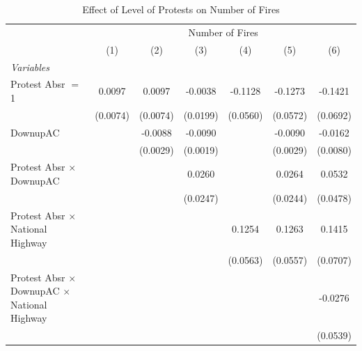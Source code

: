 
\begin{table}[htbp]
   \caption{\label{tab:protest_treat_main} Effect of Level of Protests on Number of Fires}
   \centering
   \begin{tabular}{lcccccc}
      \tabularnewline \midrule \midrule
       & \multicolumn{6}{c}{Number of Fires}\\
                                                                 & (1)           & (2)           & (3)           & (4)           & (5)           & (6)\\  
      \midrule
      \emph{Variables}\\
      Protest Absr $=$ 1                                         & 0.0097        & 0.0097        & -0.0038       & -0.1128       & -0.1273       & -0.1421\\   
                                                                 & (0.0074)      & (0.0074)      & (0.0199)      & (0.0560)      & (0.0572)      & (0.0692)\\   
      DownupAC                                                   &               & -0.0088       & -0.0090       &               & -0.0090       & -0.0162\\   
                                                                 &               & (0.0029)      & (0.0019)      &               & (0.0029)      & (0.0080)\\   
      Protest Absr $\times$ DownupAC                             &               &               & 0.0260        &               & 0.0264        & 0.0532\\   
                                                                 &               &               & (0.0247)      &               & (0.0244)      & (0.0478)\\   
      Protest Absr $\times$ National Highway                     &               &               &               & 0.1254        & 0.1263        & 0.1415\\   
                                                                 &               &               &               & (0.0563)      & (0.0557)      & (0.0707)\\   
      Protest Absr $\times$ DownupAC $\times$ National Highway   &               &               &               &               &               & -0.0276\\   
                                                                 &               &               &               &               &               & (0.0539)\\   

\end{tabular}
\end{table}

